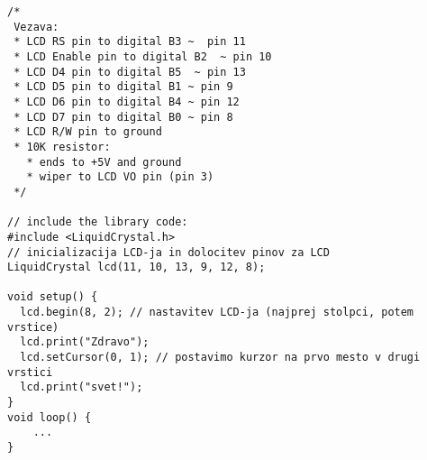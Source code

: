 \documentclass[11pt,a4paper]{article}
\begin{document}
\begin{lstlisting}
/*
 Vezava:
 * LCD RS pin to digital B3 ~  pin 11
 * LCD Enable pin to digital B2  ~ pin 10
 * LCD D4 pin to digital B5  ~ pin 13
 * LCD D5 pin to digital B1 ~ pin 9
 * LCD D6 pin to digital B4 ~ pin 12
 * LCD D7 pin to digital B0 ~ pin 8
 * LCD R/W pin to ground
 * 10K resistor:
   * ends to +5V and ground
   * wiper to LCD VO pin (pin 3)
 */

// include the library code:
#include <LiquidCrystal.h>
// inicializacija LCD-ja in dolocitev pinov za LCD
LiquidCrystal lcd(11, 10, 13, 9, 12, 8);

void setup() {
  lcd.begin(8, 2); // nastavitev LCD-ja (najprej stolpci, potem vrstice)
  lcd.print("Zdravo");
  lcd.setCursor(0, 1); // postavimo kurzor na prvo mesto v drugi vrstici
  lcd.print("svet!");
}
void loop() {
	...
}
\end{lstlisting}







\maketitle
\end{document}
